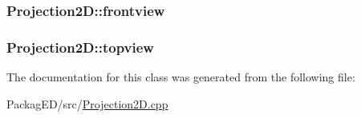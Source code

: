 \subsubsection[{\texorpdfstring{frontview}{frontview}}]{ Projection2\+D\+::frontview}\hypertarget{class_projection2_d_a1eb4d010190b1bd62bf0f9c4e4afc88a}{}\label{class_projection2_d_a1eb4d010190b1bd62bf0f9c4e4afc88a}
\subsubsection[{\texorpdfstring{topview}{topview}}]{ Projection2\+D\+::topview}\hypertarget{class_projection2_d_a90079954379a766f60ba01ad393327ab}{}\label{class_projection2_d_a90079954379a766f60ba01ad393327ab}


The documentation for this class was generated from the following file\+:\begin{DoxyCompactItemize}
\item 
Packag\+E\+D/src/\hyperlink{_projection2_d_8cpp}{Projection2\+D.\+cpp}\end{DoxyCompactItemize}
